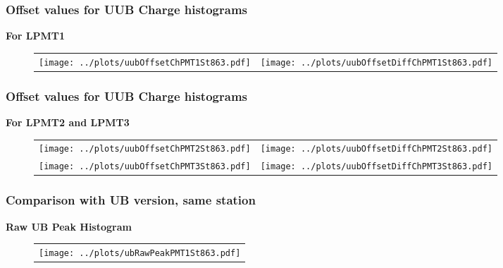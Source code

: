 \documentclass[aspectratio=169]{beamer}
\begin{document}

\begin{frame}
	\frametitle{Offset values for UUB Charge histograms}
	{\bf For LPMT1}
	\begin{figure}
		\centering
		\begin{tabularx}{\textwidth}{CC}
			\texttt{[image: ../plots/uubOffsetChPMT1St863.pdf]}
			&
			\texttt{[image: ../plots/uubOffsetDiffChPMT1St863.pdf]}
		\end{tabularx}
	\end{figure}
\end{frame}
			
			
\begin{frame}
	\frametitle{Offset values for UUB Charge histograms}
	{\bf For LPMT2 and LPMT3}
	\begin{figure}
		\centering
		\begin{tabularx}{\textwidth}{CC}
			\texttt{[image: ../plots/uubOffsetChPMT2St863.pdf]}
			&
			\texttt{[image: ../plots/uubOffsetDiffChPMT2St863.pdf]}
			\\
			\texttt{[image: ../plots/uubOffsetChPMT3St863.pdf]}
			&
			\texttt{[image: ../plots/uubOffsetDiffChPMT3St863.pdf]}
		\end{tabularx}
	\end{figure}
\end{frame}




\begin{frame}
	\frametitle{Comparison with UB version, same station}
	{\bf Raw UB Peak Histogram}
	\begin{figure}
		\begin{tabularx}{\textwidth}{C}
			\texttt{[image: ../plots/ubRawPeakPMT1St863.pdf]}
		\end{tabularx}
	\end{figure}
\end{frame}
\end{document}
